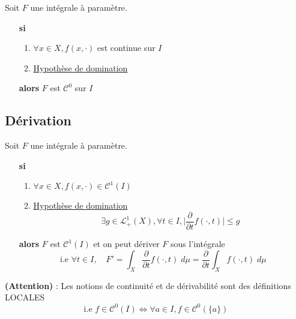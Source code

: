 \begin{corollary}
    Soit $F$ une intégrale à paramètre.
    \begin{itemize}
        \item[\textbf{si}]  \begin{enumerate}
                                \item $ \forall x \in X, f(x, \cdot)$ est continue sur $I$
                                \item \underline{Hypothèse de domination}
                            \end{enumerate}
        \item[\textbf{alors}] $F$ est $\mathcal{C}^0$ sur $I$
    \end{itemize}
\end{corollary}

\subsection{Dérivation}

\begin{theorem}
    Soit $F$ une intégrale à paramètre. 
    \begin{itemize}
        \item[\textbf{si}]  \begin{enumerate}
                                \item $ \forall x \in X, f(x, \cdot) \in \mathcal{C}^1(I)$ 
                                \item \underline{Hypothèse de domination}
                                    \[ \exists g \in \mathcal{L}_+^1(X), \forall t \in I, \Big| \frac{\partial}{\partial t} f(\cdot, t) \Big| \leq g \] 
                            \end{enumerate}
        \item[\textbf{alors}] $F$ est $\mathcal{C}^1(I)$ et on peut dériver $F$ sous l'intégrale 
            \[ \text{i.e } \forall t \in I, \quad F' = \int_X \frac{\partial}{\partial t} f(\cdot, t) \; d \mu = \frac{\partial}{\partial t} \int_X f(\cdot,t) \; d \mu \]
    \end{itemize}
\end{theorem}

\textbf{(Attention)} : Les notions de continuité et de dérivabilité sont des définitions LOCALES
    \[ \text{i.e } f \in \mathcal{C}^0(I) \Longleftrightarrow \forall a \in I, f \in \mathcal{C}^0(\{a\}) \]



